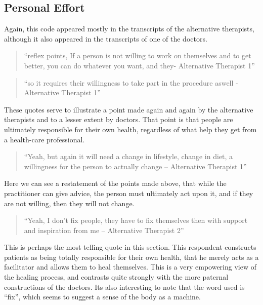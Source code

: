 \subsection{Personal Effort}

Again, this code appeared mostly in the transcripts of the alternative therapists, although it also appeared in the transcripts of one of the doctors. 

\begin{quotation}
``reflex points, If a person is not willing to work on themselves and to get better, you can do whatever you want, and they- Alternative Therapist 1''  
\end{quotation}

\begin{quotation}
``so it requires their willingness to take part in the procedure aswell - Alternative Therapist 1''  
\end{quotation}


These quotes serve to illustrate a point made again and again by the alternative therapists and to a lesser extent by doctors. That point is that people are ultimately responsible for their own health, regardless of what help they get from a health-care professional. 

\begin{quotation}
``Yeah, but again it will need a change in lifestyle, change in diet, a willingness for the person to actually change – Alternative Therapist 1''
  
\end{quotation}

Here we can see a restatement of the points made above, that while the practitioner can give advice, the person must ultimately act upon it, and if they are not willing, then they will not change. 

\begin{quotation}
``Yeah, I don't fix people, they have to fix themselves then with support and inspiration from me – Alternative Therapist 2''  
\end{quotation}


This is perhaps the most telling quote in this section. This respondent constructs patients as being totally responsible for their own health, that he merely acts as a facilitator and allows them to heal themselves. This is a very empowering view of the healing process, and contrasts quite strongly with the more paternal constructions of the doctors. Its also interesting to note that the word used is ``fix'', which seems to suggest a sense of the body as a machine. 

